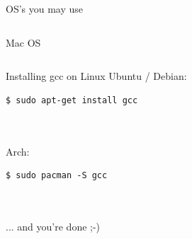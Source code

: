 \begin{frame}{OS's you may use}
\begin{columns}[T]
		Mac OS\\
		\uncover<4->{\textcolor{orange}{supported}}
	\end{columns}
\end{frame}
\begin{frame}[fragile]{Installing gcc on Linux}
	Ubuntu / Debian: 
	\begin{lstlisting}[numbers=none]
$ sudo apt-get install gcc
\end{lstlisting} \ \\ \ \\
	Arch:
	\begin{lstlisting}[numbers=none]
$ sudo pacman -S gcc
\end{lstlisting} \ \\ \ \\
	... and you're done ;-)
\end{frame}
